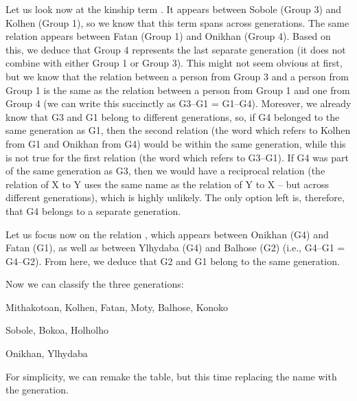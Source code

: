 \begin{refsection}
\begin{mysolution}
Let us look now at the kinship term . It appears between Sobole (Group 3) and Kolhen (Group 1), so we know that this term spans across generations. The same relation appears between Fatan (Group 1) and Onikhan (Group 4). Based on this, we deduce that Group 4 represents the last separate generation (it does not combine with either Group 1 or Group 3). This might not seem obvious at first, but we know that the relation between a person from Group 3 and a person from Group 1 is the same as the relation between a person from Group 1 and one from Group 4 (we can write this succinctly as G3--G1 = G1--G4). Moreover, we already know that G3 and G1 belong to different generations, so, if G4 belonged to the same generation as G1, then the second relation (the word  which refers to Kolhen from G1 and Onikhan from G4) would be within the same generation, while this is not true for the first relation (the word  which refers to G3--G1). If G4 was part of the same generation as G3, then we would have a reciprocal relation (the relation of X to Y uses the same name as the relation of Y to X – but across different generations), which is highly unlikely. The only option left is, therefore, that G4 belongs to a separate generation.

Let us focus now on the relation , which appears between Onikhan (G4) and Fatan (G1), as well as between Ylhydaba (G4) and Balhose (G2) (i.e., G4--G1 = G4--G2). From here, we deduce that G2 and G1 belong to the same generation.

Now we can classify the three generations:\largerpage[2]

\begin{description}[font=\normalfont]
    \item[Generation A (Gen. A):] Mithakotoan, Kolhen, Fatan, Moty, Balhose, Konoko
    \item[Generation B (Gen. B):] Sobole, Bokoa, Holholho
    \item[Generation C (Gen. C):] Onikhan, Ylhydaba
\end{description}

For simplicity, we can remake the table, but this time replacing the name with the generation.


\end{mysolution}
\end{refsection}
